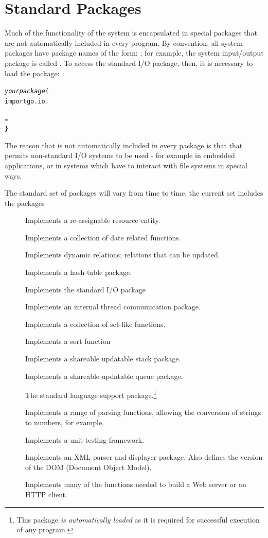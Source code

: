 \section{Standard Packages}
Much of the functionality of the \go system is encapsulated in special packages that are not automatically included in every program. By convention, all \go system packages have package names of the form: ; for example, the system input/output package is called . To access the standard I/O package, then, it is necessary to load the  package:
\begin{alltt}
\emph{yourpackage}\{
  import go.io.
  
  \ldots
\}
\end{alltt}
\begin{aside}
The reason that  is not automatically included in every package is that that permits non-standard I/O systems to be used - for example in embedded applications, or in systems which have to interact with file systems in special ways.
\end{aside}
The standard set of packages will vary from time to time, the current set includes the packages
\begin{description}
\item[] Implements a re-assignable resource entity.
\item[] Implements a collection of date related functions.
\item[] Implements dynamic relations; relations that can be updated.
\item[] Implements a hash-table package.
\item[] Implements the standard I/O package
\item[] Implements an internal thread communication package.
\item[] Implements a collection of set-like functions.
\item[] Implements a sort function
\item[] Implements a shareable updatable stack package.
\item[] Implements a shareable updatable queue package.
\item[] The standard \go language support package.\footnote{This package \emph{is automatically loaded} as it is required for successful execution of any \go program.}
\item[] Implements a range of parsing functions, allowing the conversion of strings to numbers, for example.
\item[] Implements a unit-testing framework.
\item[] Implements an XML parser and displayer package. Also defines the \go version of the DOM (Document Object Model).
\item[] Implements many of the functions needed to build a Web server or an HTTP client.
\end{description}





